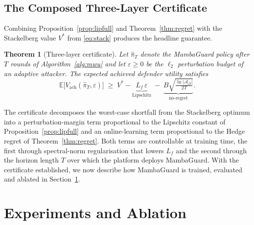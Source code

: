 \documentclass[journal,10pt,twocolumn]{IEEEtran}
\newtheorem{theorem}{Theorem}
\newcommand{\E}{\mathbb{E}}
\newcommand{\calA}{\mathcal{A}}
\begin{document}
\subsection{The Composed Three-Layer Certificate}
\label{sec:composed}
Combining Proposition~\ref{prop:lipfull} and Theorem~\ref{thm:regret} with the Stackelberg value $V^{*}$ from \eqref{eq:stack} produces the headline guarantee.

\begin{theorem}[Three-layer certificate]
\label{thm:certificate}
Let $\hat\pi_{T}$ denote the MambaGuard policy after $T$ rounds of Algorithm~\ref{alg:mwu} and let $\varepsilon\ge 0$ be the $\ell_{2}$ perturbation budget of an adaptive attacker. The expected achieved defender utility satisfies
\begin{equation}
\E\bigl[V_{\text{ach}}(\hat\pi_{T},\varepsilon)\bigr] \;\ge\; V^{*}-\underbrace{L_{f}\,\varepsilon}_{\text{Lipschitz}} \;-\; \underbrace{B\sqrt{\tfrac{\ln|\calA_{D}|}{2T}}}_{\text{no-regret}}.
\label{eq:certificate}
\end{equation}
\end{theorem}

The certificate decomposes the worst-case shortfall from the Stackelberg optimum into a perturbation-margin term proportional to the Lipschitz constant of Proposition~\ref{prop:lipfull} and an online-learning term proportional to the Hedge regret of Theorem~\ref{thm:regret}. Both terms are controllable at training time, the first through spectral-norm regularisation that lowers $L_{f}$ and the second through the horizon length $T$ over which the platform deploys MambaGuard. With the certificate established, we now describe how MambaGuard is trained, evaluated and ablated in Section~\ref{sec:experiments}.

\section{Experiments and Ablation}
\label{sec:experiments}
\end{document}
